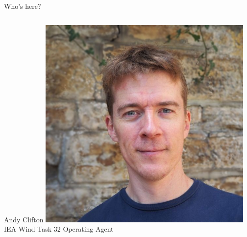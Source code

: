 
\begin{frame}{Who's here?}
    
    \begin{columns}[t]
    
    \begin{block}{Andy Clifton}
    \centering
    \includegraphics[width=0.8\textwidth]{images/Clifton_Headshot_2019_600W_600H_blur.jpg}\\
    IEA Wind Task 32 Operating Agent \\
    \end{block}
   

\end{columns}
\end{frame}
